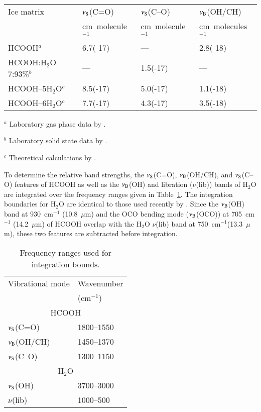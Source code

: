 \documentclass{aa}
\begin{document}
\begin{table*}
  \caption{Summary values absolute band strengths for HCOOH from the literature.}\label{ab_band}
\begin{tabular}{llll}
\hline
\hline
Ice matrix & $\nu_{\rm S}$(C=O) & $\nu_{\rm S}$(C--O) & $\nu_{\rm B}$(OH/CH) \\
                   & cm~molecule$^{-1}$ & cm~molecule$^{-1}$ & cm~molecules$^{-1}$\\
\hline
HCOOH$^a$  & 6.7(-17)           & ---               & 2.8(-18)\\
HCOOH:H$_2$O 7:93\%$^b$ & ---          & 1.5(-17)          & ---\\
HCOOH--5H$_2$O$^c$ & 8.5(-17)       & 5.0(-17)      & 1.1(-18)\\
HCOOH--6H$_2$O$^c$ & 7.7(-17)       & 4.3(-17)      & 3.5(-18)\\
\hline
\end{tabular}

$^a$ Laboratory gas phase data by \citet{marechal1987}.

$^b$ Laboratory solid state data by \citet{hudson1999}.

$^c$ Theoretical calculations by \citet{park2006}.

\end{table*}

To determine the relative band strengths, the $\nu_{\rm S}$(C=O),
$\nu_{\rm B}$(OH/CH), and $\nu_{\rm S}$(C--O) features of HCOOH as
well as the $\nu_{\rm B}$(OH) and libration ($\nu$(lib)) bands of
H$_2$O are integrated over the frequency ranges given in
Table~\ref{int}. The integration boundaries for H$_2$O are identical
to those used recently by \citet{oberg2007}. Since the $\nu_{\rm
B}$(OH) band at 930~cm$^{-1}$ (10.8~$\mu$m) and the OCO bending mode
($\nu_{\rm B}$(OCO)) at 705~cm$^{-1}$ (14.2~$\mu$m) of HCOOH overlap
with the H$_2$O $\nu$(lib) band at 750~cm$^{-1}$(13.3~$\mu$m), these
two features are subtracted before integration.

\begin{table}
\caption{Frequency ranges used for integration bounds.}\label{int}
\begin{center}
\begin{tabular}{ll}
\hline
\hline
Vibrational mode & Wavenumber \\
& (cm$^{-1}$) \\
\hline
\multicolumn{2}{c}{HCOOH}\\
\hline
$\nu_{\rm S}$(C=O)               & 1800--1550  \\
$\nu_{\rm B}$(OH/CH)           & 1450--1370 \\
$\nu_{\rm S}$(C--O)              & 1300--1150 \\
\hline
\multicolumn{2}{c}{H$_2$O}\\
\hline
$\nu_{\rm S}$(OH)              & 3700--3000 \\
$\nu$(lib)                     & 1000--500 \\
\hline
\end{tabular}
\end{center}
\end{table}
\end{document}
